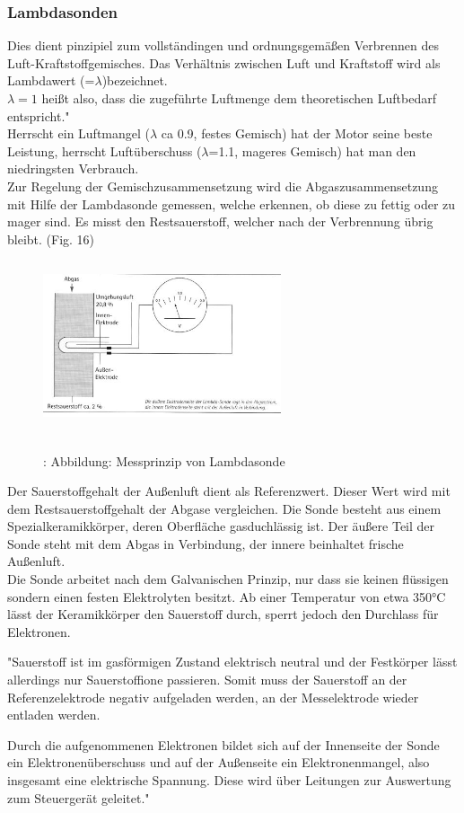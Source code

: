 	\subsubsection{Lambdasonden}
	Dies dient pinzipiel zum vollständingen und ordnungsgemäßen Verbrennen des Luft-Kraftstoffgemisches. Das Verhältnis zwischen Luft und Kraftstoff wird als Lambdawert (=$\lambda$)bezeichnet.\\
	$\lambda = 1$ heißt also, dass die zugeführte Luftmenge dem theoretischen Luftbedarf entspricht."\cite{TS_lambda}\\
	Herrscht ein Luftmangel ($\lambda$ ca 0.9, festes Gemisch) hat der Motor seine beste Leistung, herrscht Luftüberschuss ($\lambda$=1.1, mageres Gemisch) hat man den niedringsten Verbrauch.\\
	Zur Regelung der Gemischzusammensetzung wird die Abgaszusammensetzung mit Hilfe der Lambdasonde gemessen, welche erkennen, ob diese zu fettig oder zu mager sind. Es misst den Restsauerstoff, welcher nach der Verbrennung übrig bleibt. (Fig. 16)		
	
	\begin{figure}
		\includegraphics[width=7cm, height=5cm] {lambdasonde.png}
		\caption {\\\cite{TS_lambda_pic}: Abbildung: Messprinzip von Lambdasonde}
	\end{figure}
	
	\begin{flushleft}
		Der Sauerstoffgehalt der Außenluft dient als Referenzwert. Dieser Wert wird mit dem Restsauerstoffgehalt der Abgase vergleichen. Die Sonde besteht aus einem Spezialkeramikkörper, deren Oberfläche gasduchlässig ist. Der äußere Teil der Sonde steht mit dem Abgas in Verbindung, der innere beinhaltet frische Außenluft.\\
		Die Sonde arbeitet nach dem Galvanischen Prinzip, nur dass sie keinen flüssigen sondern einen festen Elektrolyten besitzt. Ab einer Temperatur von etwa 350°C lässt der Keramikkörper den Sauerstoff durch, sperrt jedoch den Durchlass für Elektronen.
		
		"Sauerstoff ist im gasförmigen Zustand elektrisch neutral und der Festkörper lässt allerdings nur Sauerstoffione passieren. Somit muss der Sauerstoff an der Referenzelektrode negativ aufgeladen werden, an der Messelektrode wieder entladen werden.
		
		Durch die aufgenommenen Elektronen bildet sich auf der Innenseite der Sonde ein Elektronenüberschuss und auf der Außenseite ein Elektronenmangel, also insgesamt eine elektrische Spannung. Diese wird über Leitungen zur Auswertung zum Steuergerät geleitet."\cite{TS_lambda}
	\end{flushleft}
	
